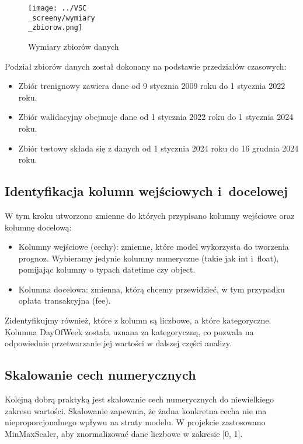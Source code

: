 \documentclass[12pt,a4paper]{report}
\theoremstyle{definition} %
\begin{document}
	\begin{figure}[H]
	    \centering
	    \texttt{[image: ../VSC\\\_screeny/wymiary\\\_zbiorow.png]} 
	    \caption{Wymiary zbiorów danych}
	    \label{fig:wymiaryZbiorow}
	\end{figure}
	\hspace*{\parindent}Podział zbiorów danych został dokonany na podstawie przedziałów czasowych:
	\begin{itemize}
	    \item Zbiór trenignowy zawiera dane od 9 stycznia 2009 roku do 1 stycznia 2022 roku.
	    \item Zbiór walidacyjny obejmuje dane od 1 stycznia 2022 roku do 1 stycznia 2024 roku.
	    \item Zbiór testowy składa się z danych od 1 stycznia 2024 roku do 16 grudnia 2024 roku.
	\end{itemize}

	\subsection{Identyfikacja kolumn wejściowych i~docelowej}
	\hspace*{\parindent}W tym kroku utworzono zmienne do których przypisano kolumny wejściowe oraz kolumnę docelową:
	\begin{itemize}
	    \item Kolumny wejściowe (cechy): zmienne, które model wykorzysta do tworzenia prognoz. Wybieramy jedynie kolumny numeryczne (takie jak int i~float), pomijając kolumny o typach datetime czy object.
	    \item Kolumna docelowa: zmienna, którą chcemy przewidzieć, w tym przypadku opłata transakcyjna (fee).
	\end{itemize}

	Zidentyfikujmy również, które z kolumn są liczbowe, a które kategoryczne. Kolumna DayOfWeek została uznana za kategoryczną, co pozwala na odpowiednie przetwarzanie jej wartości w dalszej części analizy.
	
	\subsection{Skalowanie cech numerycznych}
	\hspace*{\parindent}Kolejną dobrą praktyką jest skalowanie cech numerycznych do niewielkiego zakresu wartości. Skalowanie zapewnia, że żadna konkretna cecha nie ma nieproporcjonalnego wpływu na straty modelu. W projekcie zastosowano MinMaxScaler, aby znormalizować dane liczbowe w zakresie [0, 1].
\end{document}
